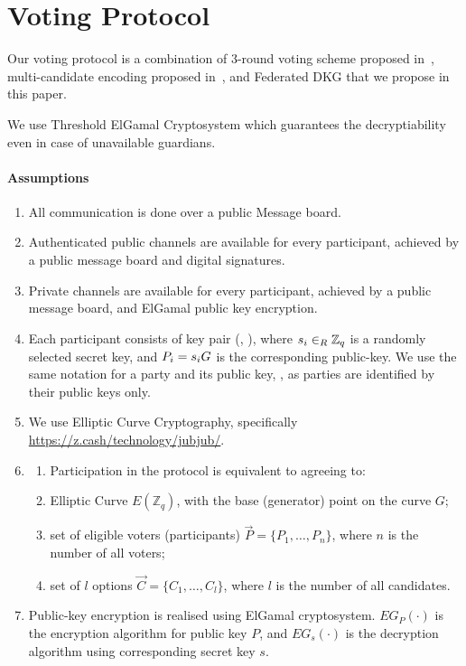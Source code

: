\documentclass{article}
\begin{document}
\section{Voting Protocol}
Our voting protocol is a combination of 3-round voting scheme proposed in~\cite{schoenmakersLectureNotesCryptographic2018}, multi-candidate encoding proposed in~\cite{haoAnonymousVotingTworound2010}, and Federated DKG that we propose in this paper. 

We use Threshold ElGamal Cryptosystem which guarantees the decryptiability even in case of unavailable guardians.

\paragraph*{Assumptions}
\begin{enumerate}
    \item All communication is done over a public Message board.
    \item Authenticated public channels are available for every participant, achieved by a public message board and digital signatures.
    \item Private channels are available for every participant, achieved by a public message board, and ElGamal public key encryption.
    \item Each participant  consists of key pair (, ), where $s_{i} \in_{R} \mathbb{Z}_q$ is a randomly selected secret key, and $P_{i} = s_{i} G$ is the corresponding public-key. We use the same notation for a party and its public key, , as parties are identified by their public keys only.
    \item We use Elliptic Curve Cryptography, specifically \href{babyJubJub curve}{https://z.cash/technology/jubjub/}.
    \item \begin{enumerate}
        \item Participation in the protocol is equivalent to agreeing to:
        \item Elliptic Curve $E(\mathbb{Z}_q)$, with the base (generator) point on the curve $G$;
        \item set of eligible voters (participants) $\vec{P}=\{P_1,\dots,P_n\}$, where $n$ is the number of all voters;
        \item set of $l$ options $\vec{C}=\{C_1, \dots, C_l\}$, where $l$ is the number of all candidates. %
    \end{enumerate}
    \item Public-key encryption is realised using ElGamal cryptosystem. $EG_{P}(\cdot)$ is the encryption algorithm for public key $P$, and $EG_{s}(\cdot)$ is the decryption algorithm using corresponding secret key $s$.
\end{enumerate}
\end{document}
